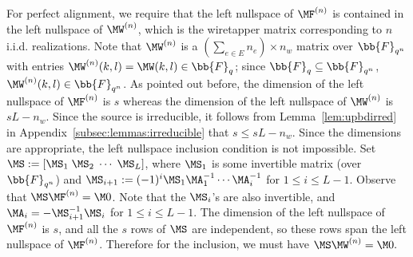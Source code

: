  For perfect alignment, we require that the left nullspace of $\MF^{(n)}$ is contained in  the left nullspace of $\MW^{(n)}$, which is the wiretapper matrix corresponding to $n$ i.i.d. realizations. Note that $\MW^{(n)}$ is a $\left(\sum_{e \in E} n_e\right) \times n_w$ matrix over $\bb{F}_{q^n}$ with entries $\MW^{(n)}(k,l) = \MW(k,l) \in  \bb{F}_{q}$; since $\bb{F}_{q} \subseteq \bb{F}_{q^n}$, $\MW^{(n)}(k,l) \in \bb{F}_{q^n}$. As pointed out before, the dimension of the  left nullspace of $\MF^{(n)}$ is $s$ whereas the dimension of the left nullspace of $\MW^{(n)}$ is $sL-n_w$. Since the source is irreducible, it follows from Lemma~\ref{lem:upbdirred} in Appendix~\ref{subsec:lemmas:irreducible} that $s \leq sL-n_w$. Since the dimensions are appropriate, the left nullspace inclusion condition is not impossible. Set $\MS := [\MS_1 \; \MS_2 \; \cdots \; \MS_L]$, where  $\MS_1$  is some invertible matrix (over $\bb{F}_{q^n}$) and $\MS_{i+1} :=(-1)^{i}\MS_1\MA_{1}^{-1}\cdots \MA_{i}^{-1}$ for $1 \leq i \leq L-1$. Observe that $\MS \MF^{(n)}=\M0$. Note that the $\MS_i$'s are also invertible, and $\MA_i= -\MS_{i+1}^{-1}\MS_i$ for $1 \leq i \leq L-1$.
The dimension of the left nullspace of $\MF^{(n)}$ is $s$, and all the $s$ rows of $\MS$ are independent,  so these rows span the left nullspace of $\MF^{(n)}$. Therefore for the inclusion, we must have $\MS\MW^{(n)} =\M0.$

